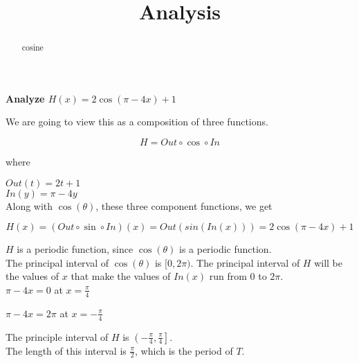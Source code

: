 \documentclass{ximera}
\title{Analysis}
\begin{document}
\begin{abstract}
cosine
\end{abstract}
\maketitle












\textbf{\textcolor{purple!85!blue}{Analyze  $H(x) =  2 \cos(\pi - 4x) + 1$}}





\begin{template}


We are going to view this as a composition of three functions.


\[
H = Out \circ \cos \circ In
\]


where


$Out(t) = 2t + 1$ \\


$In(y) = \pi - 4y$ \\




Along with $\cos(\theta)$, these three component functions, we get



\[
H(x) = (Out \circ \sin \circ In)(x) = Out(sin(In(x)))  = 2 \cos(\pi - 4x) + 1
\]




\end{template}

$H$ is a periodic function, since $\cos(\theta)$ is a periodic function. \\

The principal interval of $\cos(\theta)$ is $[0, 2\pi)$.  The principal interval of $H$ will be the values of $x$ that make the values of $In(x)$ run from $0$ to $2\pi$. \\


$\pi - 4x = 0$ at $x = \frac{\pi}{4}$

$\pi - 4x = 2\pi$ at $x = -\frac{\pi}{4}$

The principle interval of $H$ is $\left( -\frac{\pi}{4}, \frac{\pi}{4} \right]$. \\

The length of this interval is $\frac{\pi}{2}$, which is the period of $T$. \\
\end{document}
